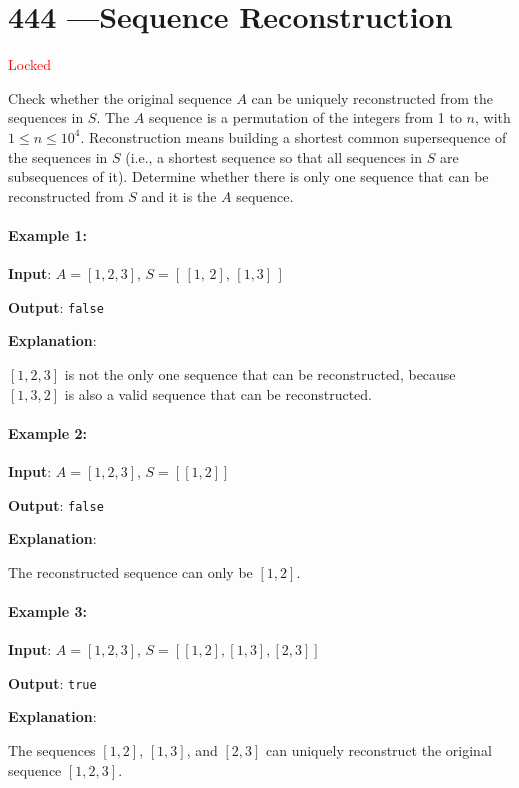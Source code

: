 \section{444 ---Sequence Reconstruction}
\textcolor{red}{\large Locked}

Check whether the original sequence $A$ can be uniquely reconstructed from the sequences in $S$. The $A$ sequence is a permutation of the integers from 1 to $n$, with $1 \leq n \leq 10^4$. Reconstruction means building a shortest common supersequence of the sequences in $S$ (i.e., a shortest sequence so that all sequences in $S$ are subsequences of it). Determine whether there is only one sequence that can be reconstructed from $S$ and it is the $A$ sequence.

\paragraph{Example 1:}

\begin{flushleft}
\textbf{Input}: $A= [1,2,3]$, $S= [\,[1,\,2],\,[1,3]\,]$

\textbf{Output}: \texttt{false}

\textbf{Explanation}:

$[1,2,3]$ is not the only one sequence that can be reconstructed, because $[1,3,2]$ is also a valid sequence that can be reconstructed.
\end{flushleft}

\paragraph{Example 2:}

\begin{flushleft}
\textbf{Input}: $A= [1,2,3]$, $S= [[1,2]]$

\textbf{Output}: \texttt{false}

\textbf{Explanation}:

The reconstructed sequence can only be $[1,2]$.
\end{flushleft}


\paragraph{Example 3:}

\begin{flushleft}
\textbf{Input}: $A = [1,2,3]$, $S = [[1,2],[1,3],[2,3]]$

\textbf{Output}: \texttt{true}

\textbf{Explanation}:

The sequences $ [1,2] $, $ [1,3] $, and $ [2,3] $ can uniquely reconstruct the original sequence $ [1,2,3] $.

\end{flushleft}

